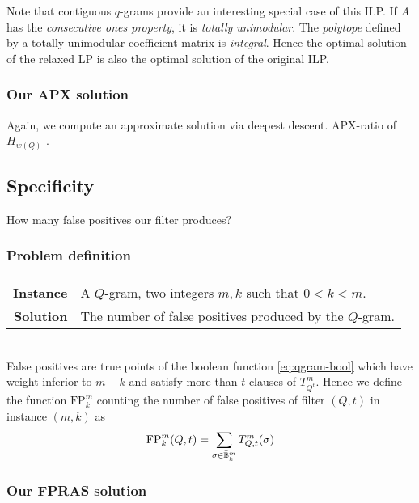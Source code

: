 Note that contiguous $q$-grams provide an interesting special case of this ILP.
If $A$ has the \emph{consecutive ones property}, it is \emph{totally unimodular}.
The \emph{polytope} defined by a totally unimodular coefficient matrix is \emph{integral}.
Hence the optimal solution of the relaxed LP is also the optimal solution of the original ILP.


\subsubsection{Our APX solution}

Again, we compute an approximate solution via deepest descent.
APX-ratio of $H_{w(Q)}$ \citep{NemhauserWolsey99}.


\subsection{Specificity}

How many false positives our filter produces?

\subsubsection{Problem definition}

\paragraph{}
\begin{tabular}{rl}
{\bf Instance}	&	A $Q$-gram, two integers $m,k$ such that $0 < k < m$.\\
{\bf Solution}	&	The number of false positives produced by the $Q$-gram.\\
\end{tabular}
\\

False positives are true points of the boolean function \ref{eq:qgram-bool} which have weight inferior to $m-k$ and satisfy more than $t$ clauses of $T_{Q^t}^{m}$.
Hence we define the function $\text{FP}_{k}^{m}$ counting the number of false positives of filter $(Q,t)$ in instance $(m,k)$ as
\begin{equation}
\text{FP}_{k}^{m}(Q,t) = \sum_{\sigma \in {\bar{\ensuremath{\mathbb {B}}}^{m}_{k}}} T_{Q,t}^{m}(\sigma)
\end{equation}

\subsubsection{Our FPRAS solution}

